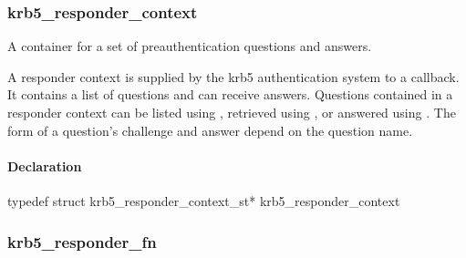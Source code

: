 \documentclass[letterpaper,10pt,english]{sphinxmanual}
\begin{document}
\subsubsection{krb5\_responder\_context}
\label{appdev/refs/types/krb5_responder_context:krb5-responder-context-struct}\label{appdev/refs/types/krb5_responder_context::doc}\label{appdev/refs/types/krb5_responder_context:krb5-responder-context}

\begin{fulllineitems}
\label{appdev/refs/types/krb5_responder_context:krb5_responder_context}
\end{fulllineitems}


A container for a set of preauthentication questions and answers.

A responder context is supplied by the krb5 authentication system to a {\hyperref[appdev/refs/types/krb5_responder_fn:krb5_responder_fn]{}} callback. It contains a list of questions and can receive answers. Questions contained in a responder context can be listed using {\hyperref[appdev/refs/api/krb5_responder_list_questions:krb5_responder_list_questions]{}} , retrieved using {\hyperref[appdev/refs/api/krb5_responder_get_challenge:krb5_responder_get_challenge]{}} , or answered using {\hyperref[appdev/refs/api/krb5_responder_set_answer:krb5_responder_set_answer]{}} . The form of a question's challenge and answer depend on the question name.


\paragraph{Declaration}
\label{appdev/refs/types/krb5_responder_context:declaration}
typedef struct krb5\_responder\_context\_st* krb5\_responder\_context


\subsubsection{krb5\_responder\_fn}
\label{appdev/refs/types/krb5_responder_fn:krb5-responder-fn-struct}\label{appdev/refs/types/krb5_responder_fn::doc}\label{appdev/refs/types/krb5_responder_fn:krb5-responder-fn}

\begin{fulllineitems}
\label{appdev/refs/types/krb5_responder_fn:krb5_responder_fn}
\end{fulllineitems}
\end{document}
